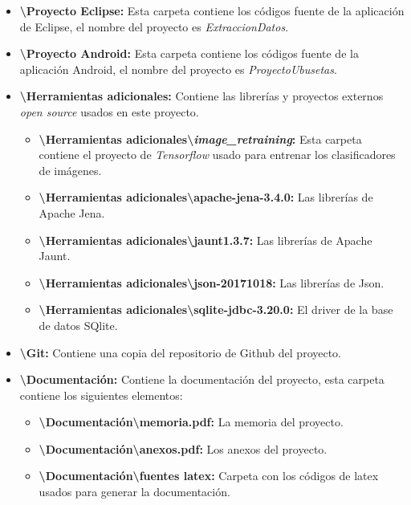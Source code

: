 \begin{itemize}
	\item \textbf{\textbackslash Proyecto Eclipse:} Esta carpeta contiene los códigos fuente de la aplicación de Eclipse, el nombre del proyecto es \textit{ExtraccionDatos}.
	
	\item \textbf{\textbackslash Proyecto Android:} Esta carpeta contiene los códigos fuente de la aplicación Android, el nombre del proyecto es \textit{ProyectoUbusetas}.
	
	\item \textbf{\textbackslash Herramientas adicionales:} Contiene las librerías y proyectos externos \textit{open source} usados en este proyecto. 
	
	\begin{itemize}
	 	\item \textbf{\textbackslash Herramientas adicionales\textbackslash \textit{image\_retraining}:} Esta carpeta contiene el proyecto de \textit{Tensorflow} usado para entrenar los clasificadores de imágenes.
	 	\item \textbf{\textbackslash Herramientas adicionales\textbackslash apache-jena-3.4.0:} Las librerías de Apache Jena.
	 	\item \textbf{\textbackslash Herramientas adicionales\textbackslash jaunt1.3.7:} Las librerías de Apache Jaunt.
	 	\item \textbf{\textbackslash Herramientas adicionales\textbackslash json-20171018:} Las librerías de Json.
	 	\item \textbf{\textbackslash Herramientas adicionales\textbackslash sqlite-jdbc-3.20.0:} El driver de la base de datos SQlite.
	\end{itemize}
	 
	\item \textbf{\textbackslash Git:} Contiene una copia del repositorio de Github del proyecto.
	 
	\item \textbf{\textbackslash Documentación:} Contiene la documentación del proyecto, esta carpeta contiene los siguientes elementos:
	\begin{itemize}
		\item \textbf{\textbackslash Documentación\textbackslash memoria.pdf:} La memoria del proyecto.
	 	\item \textbf{\textbackslash Documentación\textbackslash anexos.pdf:} Los anexos del proyecto.
	 	\item \textbf{\textbackslash Documentación\textbackslash fuentes latex:} Carpeta con los códigos de latex usados para generar la documentación.
	\end{itemize}
	 

\end{itemize}

